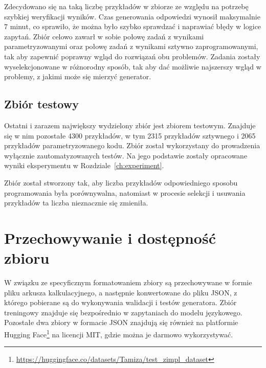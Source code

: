 Zdecydowano się na taką liczbę przykładów w zbiorze ze względu na potrzebę szybkiej weryfikacji wyników. Czas generowania odpowiedzi wynosił maksymalnie 7 minut, %
 co sprawiło, że można było szybko sprawdzać i naprawiać błędy w logice zapytań. Zbiór celowo zawarł w sobie połowę zadań z wynikami parametryzowanymi oraz połowę zadań z wynikami sztywno zaprogramowanymi, tak aby zapewnić poprawny wgląd do rozwiązań obu problemów. Zadania zostały wyselekcjonowane w różnorodny sposób, tak aby dać możliwie najszerszy wgląd w problemy, z jakimi może się mierzyć generator. %

\subsection{Zbiór testowy}

Ostatni i zarazem największy wydzielony zbiór jest zbiorem testowym. Znajduje się w nim pozostałe 4300 przykładów, w tym 2315 przykładów sztywnego i 2065 przykładów parametryzowanego kodu. Zbiór został wykorzystany do prowadzenia wyłącznie zautomatyzowanych testów. Na jego podstawie zostały opracowane wyniki eksperymentu w Rozdziale~\ref{ch:experiment}.

Zbiór został stworzony tak, aby liczba przykładów odpowiedniego sposobu programowania była porównywalna, natomiast w procesie selekcji i usuwania przykładów ta liczba nieznacznie się zmieniła.

\section{Przechowywanie i dostępność zbioru}

W związku ze specyficznym formatowaniem zbiory są przechowywane w formie pliku arkusza kalkulacyjnego, a następnie konwertowane do pliku JSON, z którego pobierane są do wykonywania walidacji i testów generatora. Zbiór treningowy znajduje się bezpośrednio w zapytaniach do modelu językowego. Pozostałe dwa zbiory w formacie JSON znajdują się również na platformie Hugging Face\footnote{\label{fn:dataset:link}\url{https://huggingface.co/datasets/Tamiza/test_zimpl_dataset}} na licencji MIT, gdzie można je darmowo wykorzystywać. %